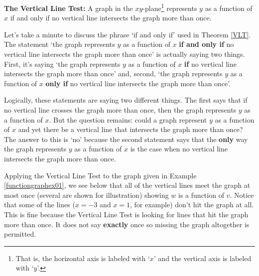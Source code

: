 \documentclass{ximera}
\begin{document}
 


\begin{theorem}  \textbf{The Vertical Line Test:}   A graph in the $xy$-plane\footnote{That is, the horizontal axis is labeled with `$x$' and the vertical axis is labeled with `$y$'.}  represents $y$ as a function of $x$ if and only if no vertical line intersects the graph more than once.
\label{VLT}

\end{theorem}

  

Let's take a minute to discuss the phrase `if and only if' used in Theorem \ref{VLT}.   The statement `the graph represents $y$ as a function of $x$ \textbf{if and only if} no vertical line intersects the graph more than once' is actually saying two things.  First, it's saying `the graph represents $y$ as a function of $x$  \textbf{if} no vertical line intersects the graph more than once' and, second,  `the graph represents $y$ as a function of $x$  \textbf{only if} no vertical line intersects the graph more than once'.   

 

Logically, these statements are saying two different things. The first says that if no vertical line crosses the graph more than once, then the graph represents $y$ as a function of $x$.  But the question remains:  could a graph represent $y$ as a function of $x$ and yet there be a vertical line that intersects the graph more than once?  The answer to this is `no' because the second statement says that the \textbf{only} way the graph represents $y$ as a function of $x$ is the case when no vertical line intersects the graph more than once.

% 
 

Applying the Vertical Line Test to the graph given in Example \ref{functiongraphex01}, we see below that all of the vertical lines meet the graph at most once (several are shown for illustration) showing $w$ is a function of $v$.  Notice that some of the lines ($x = -3$ and $x = 1$, for example) don't hit the graph at all.  This is fine because the Vertical Line Test is looking for lines that hit the graph more than once.  It does not say \textbf{exactly} once so missing the graph altogether is permitted.
\end{document}
